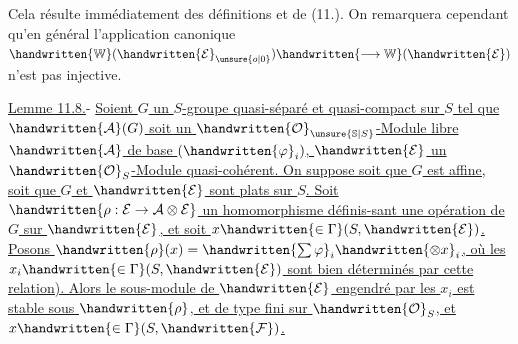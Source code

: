 Cela résulte immédiatement des définitions et de (11.). On remarquera cependant qu'en général l'application canonique $\handwritten{\mathbb{W}}(\handwritten{\mathcal{E}}_{\unsure{o|0}})\handwritten{\longrightarrow\mathbb{W}}(\handwritten{\mathcal{E}})$ n'est pas injective.

\uline{Lemme 11.8.}- \uline{Soient $G$ un $S$-groupe quasi-séparé et quasi-compact sur $S$ tel que $\handwritten{\mathcal{A}}(G)$ soit un $\handwritten{\mathcal{O}}_{\unsure{\mathbb{S}|S}}$-Module  libre $\handwritten{\mathcal{A}}$ de base $(\handwritten{\varphi}_i)$, $\handwritten{\mathcal{E}}$ un $\handwritten{\mathcal{O}}_S$-Module quasi-cohérent. On suppose soit que $G$ est affine, soit que $G$ et $\handwritten{\mathcal{E}}$ sont plats sur $S$. Soit $\handwritten{\rho:\mathcal{E}\to\mathcal{A}\otimes\mathcal{E}}$ un homomorphisme définis-\linebreak sant une opération de $G$ sur $\handwritten{\mathcal{E}}$, et soit $x\handwritten{\in\Gamma}(S,\handwritten{\mathcal{E}})$. Posons $\handwritten{\rho}(x)=\handwritten{\sum\varphi}_i\handwritten{\otimes x}_i$, où les $x_i\handwritten{\in\Gamma}(S,\handwritten{\mathcal{E}})$ sont bien déterminés par cette relation). Alors le sous-module de $\handwritten{\mathcal{E}}$ engendré par les $x_i$ est stable sous $\handwritten{\rho}$, et de type fini sur $\handwritten{\mathcal{O}}_S$, et $x\handwritten{\in\Gamma}(S,\handwritten{\mathcal{F}})$.}

